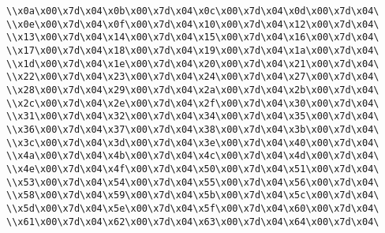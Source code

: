 \verb|\\x0a\x00\x7d\x04\x0b\x00\x7d\x04\x0c\x00\x7d\x04\x0d\x00\x7d\x04\|\newline
\verb|\\x0e\x00\x7d\x04\x0f\x00\x7d\x04\x10\x00\x7d\x04\x12\x00\x7d\x04\|\newline
\verb|\\x13\x00\x7d\x04\x14\x00\x7d\x04\x15\x00\x7d\x04\x16\x00\x7d\x04\|\newline
\verb|\\x17\x00\x7d\x04\x18\x00\x7d\x04\x19\x00\x7d\x04\x1a\x00\x7d\x04\|\newline
\verb|\\x1d\x00\x7d\x04\x1e\x00\x7d\x04\x20\x00\x7d\x04\x21\x00\x7d\x04\|\newline
\verb|\\x22\x00\x7d\x04\x23\x00\x7d\x04\x24\x00\x7d\x04\x27\x00\x7d\x04\|\newline
\verb|\\x28\x00\x7d\x04\x29\x00\x7d\x04\x2a\x00\x7d\x04\x2b\x00\x7d\x04\|\newline
\verb|\\x2c\x00\x7d\x04\x2e\x00\x7d\x04\x2f\x00\x7d\x04\x30\x00\x7d\x04\|\newline
\verb|\\x31\x00\x7d\x04\x32\x00\x7d\x04\x34\x00\x7d\x04\x35\x00\x7d\x04\|\newline
\verb|\\x36\x00\x7d\x04\x37\x00\x7d\x04\x38\x00\x7d\x04\x3b\x00\x7d\x04\|\newline
\verb|\\x3c\x00\x7d\x04\x3d\x00\x7d\x04\x3e\x00\x7d\x04\x40\x00\x7d\x04\|\newline
\verb|\\x4a\x00\x7d\x04\x4b\x00\x7d\x04\x4c\x00\x7d\x04\x4d\x00\x7d\x04\|\newline
\verb|\\x4e\x00\x7d\x04\x4f\x00\x7d\x04\x50\x00\x7d\x04\x51\x00\x7d\x04\|\newline
\verb|\\x53\x00\x7d\x04\x54\x00\x7d\x04\x55\x00\x7d\x04\x56\x00\x7d\x04\|\newline
\verb|\\x58\x00\x7d\x04\x59\x00\x7d\x04\x5b\x00\x7d\x04\x5c\x00\x7d\x04\|\newline
\verb|\\x5d\x00\x7d\x04\x5e\x00\x7d\x04\x5f\x00\x7d\x04\x60\x00\x7d\x04\|\newline
\verb|\\x61\x00\x7d\x04\x62\x00\x7d\x04\x63\x00\x7d\x04\x64\x00\x7d\x04\|\newline
